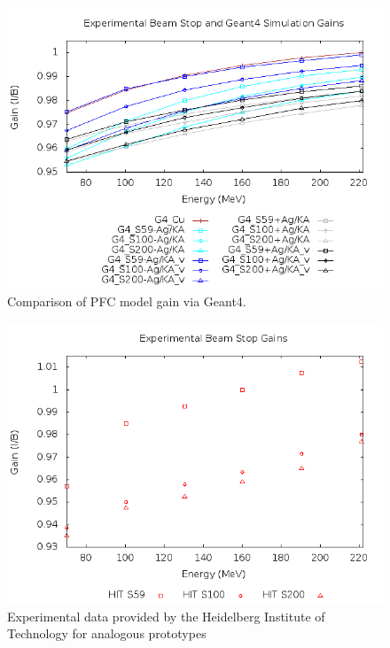\documentclass{article}
\begin{document}
\begin{figure}[H]
  \centering
  \includegraphics[width=5in]{figures/fig_G4_results.png}
  \caption{Comparison of PFC model gain via Geant4.} 
  \label{fig:G4_results}
\end{figure}

\begin{figure}[H]
  \centering
  \includegraphics[width=6in]{figures/fig_HIT_results.png}
  \caption{Experimental data provided by the Heidelberg Institute of Technology for analogous prototypes} 
  \label{fig:HIT_data}
\end{figure}
\end{document}
